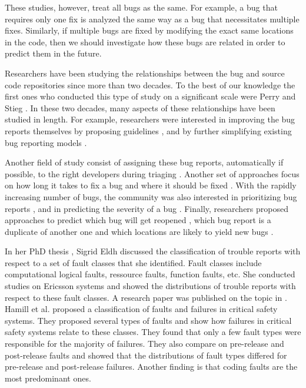 These studies, however, treat all bugs as the same. For
example, a bug that requires only one fix is analyzed the same way as a bug that necessitates multiple fixes.
Similarly, if multiple bugs are fixed by modifying the exact same locations in the code, then we should investigate how these bugs are related in order to predict them in the future.

Researchers have been studying the relationships between the bug and source code repositories since more than two decades.
To the best of our knowledge the first ones who conducted this type of study on a significant scale were Perry and Stieg \cite{PerryDewayneE.1993}.
In these two decades, many aspects of these relationships have been studied in length.
For example, researchers were interested in improving the bug reports themselves by proposing guidelines \cite{Bettenburg2008}, and by further simplifying existing bug reporting models \cite{Herraiz2008}.

Another field of study consist of assigning these bug reports, automatically if possible, to the right developers during triaging \cite{Anvik2006,Jeong2009,Tamrawi2011a,Bortis2013}.
Another set of approaches focus on how long it takes to fix a bug \cite{Bhattacharya2011,Zhang2013,Saha2014} and where it should be fixed \cite{Zeller2013a,Zhou2012}.
With the rapidly increasing number of bugs, the community was also interested in prioritizing bug reports \cite{Kim2011c}, and in predicting the severity of a bug \cite{Lamkanfi2010}.
Finally, researchers proposed approaches to predict which bug will get reopened \cite{Zimmermann2012,Lo2013}, which bug report is a duplicate of another one \cite{Bettenburg2008a,Tian2012a,Jalbert2008} and which locations are likely to yield new bugs \cite{Kim2006,Kim2007a}.

In her PhD thesis \cite{Eldh2001}, Sigrid Eldh discussed the classification of trouble reports with respect to a set of fault classes that she identified.
Fault classes include computational logical faults, ressource faults, function faults, etc.
She conducted studies on Ericsson systems and showed the distributions of trouble reports with respect to these fault classes.
A research paper was published on the topic in \cite{Eldh2007}.
Hamill et al.\cite{Hamill2014} proposed a classification of faults and failures in critical safety systems.
They proposed several types of faults and show how failures in critical safety systems relate to these classes.
They found that only a few fault types were responsible for the majority of failures.
They also compare on pre-release and post-release faults and showed that the distributions of fault types differed for pre-release and post-release failures.
Another finding is that coding faults are the most predominant ones.

